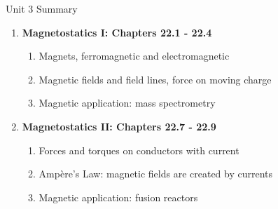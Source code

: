 \documentclass{beamer}
\begin{document}
\begin{frame}{Unit 3 Summary}
\begin{enumerate}
\item \textbf{Magnetostatics I: Chapters 22.1 - 22.4}
\begin{enumerate}
\item Magnets, ferromagnetic and electromagnetic
\item Magnetic fields and field lines, force on moving charge
\item Magnetic application: \alert{mass spectrometry}
\end{enumerate}
\item \textbf{Magnetostatics II: Chapters 22.7 - 22.9}
\begin{enumerate}
\item Forces and torques on conductors with current
\item Amp\`{e}re's Law: magnetic fields are created by currents
\item Magnetic application: \alert{fusion reactors}
\end{enumerate}
\end{enumerate}
\end{frame}
\end{document}
